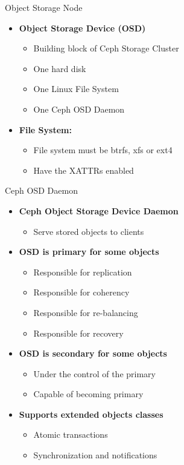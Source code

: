 \begin{frame}{Object Storage Node}
    \begin{itemize}
        \item \textbf{Object Storage Device (OSD)}
            \begin{itemize}   
                \item Building block of Ceph Storage Cluster
                \item One hard disk
                \item One Linux File System
                \item One Ceph OSD Daemon
            \end{itemize}
        \item \textbf{File System:}
            \begin{itemize}
                \item File system must be btrfs, xfs or ext4
                \item Have the XATTRs enabled
            \end{itemize}
   \end{itemize} 
\end{frame}

\begin{frame}{Ceph OSD Daemon}
    \begin{itemize}
        \item \textbf{Ceph Object Storage Device Daemon}
            \begin{itemize}
                \item Serve stored objects to clients
            \end{itemize}
        \item \textbf{OSD is primary for some objects}
            \begin{itemize}
                \item Responsible for replication
                \item Responsible for coherency
                \item Responsible for re-balancing
                \item Responsible for recovery
            \end{itemize}
        \item \textbf{OSD is secondary for some objects}
            \begin{itemize}
                \item Under the control of the primary
                \item Capable of becoming primary
            \end{itemize}
        \item \textbf{Supports extended objects classes}
            \begin{itemize}
                \item Atomic transactions
                \item Synchronization and notifications
            \end{itemize}
    \end{itemize}
\end{frame}

